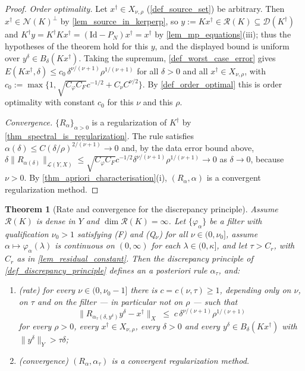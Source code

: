 \documentclass[a4paper]{report}
\theoremstyle{plain}
\newtheorem{theorem}{Theorem}[chapter]
\theoremstyle{definition}
\theoremstyle{remark}
\newcommand{\Ll}{\mathcal{L}}
\newcommand{\Ran}{\mathcal{R}}
\newcommand{\Ker}{\mathcal{N}}
\newcommand{\Dom}{\mathcal{D}}
\newcommand{\Id}{\mathrm{Id}}
\newcommand{\dg}{^{\dagger}}
\begin{document}
\begin{proof}
  \emph{Order optimality.}  Let $x\dg \in X_{\nu,\rho}$ (\cref{def_source_set}) be
  arbitrary.  Then $x\dg \in
  \Ker(K)^{\perp}$ by \cref{lem_source_in_kerperp}, so $y := Kx\dg \in \Ran(K) \subseteq
  \Dom(K\dg)$ and $K\dg y = K\dg Kx\dg = (\Id - P_N)x\dg = x\dg$ by
  \cref{lem_mp_equations}(iii); thus the hypotheses of the theorem hold for this $y$, and
  the displayed bound is uniform over $y^{\delta} \in B_{\delta}(Kx\dg)$.  Taking the
  supremum, \cref{def_worst_case_error} gives $E(Kx\dg,\delta) \le
  c_0\,\delta^{\nu/(\nu+1)}\rho^{1/(\nu+1)}$ for all $\delta > 0$ and all $x\dg \in
  X_{\nu,\rho}$, with $c_0 := \max\{1, \sqrt{C_{\varphi}C_F}c^{-1/2}
  + C_{\nu}C^{\nu/2}\}$.
  By \cref{def_order_optimal} this is order optimality with constant $c_0$ for this $\nu$
  and this $\rho$.

  \emph{Convergence.}  $\{R_{\alpha}\}_{\alpha>0}$ is a regularization of $K\dg$ by
  \cref{thm_spectral_is_regularization}.  The rule satisfies $\alpha(\delta) \le
  C(\delta/\rho)^{2/(\nu+1)} \to 0$ and, by the data error bound above,
  $\delta\|R_{\alpha(\delta)}\|_{\Ll(Y,X)} \le \sqrt{C_{\varphi}C_F}c^{-1/2}
  \delta^{\nu/(\nu+1)}\rho^{1/(\nu+1)} \to 0$ as $\delta \to 0$, because $\nu > 0$.  By
  \cref{thm_apriori_characterisation}(i), $(R_{\alpha},\alpha)$ is a convergent
  regularization method.
\end{proof}


\begin{theorem}[Rate and convergence for the discrepancy principle]
  \label{thm_discrepancy_order_optimal}
  Assume $\Ran(K)$ is dense in $Y$ and $\dim\Ran(K) = \infty$.  Let $\{\varphi_{\alpha}\}$
  be a filter with qualification $\nu_0 > 1$ satisfying (F) and (Q$_{\nu}$) for all
  $\nu \in (0,\nu_0]$, assume $\alpha \mapsto \varphi_{\alpha}(\lambda)$ is continuous on
  $(0,\infty)$ for each $\lambda \in (0,\kappa]$, and let $\tau > C_r$, with $C_r$ as in
  \cref{lem_residual_constant}.  Then the discrepancy principle of
  \cref{def_discrepancy_principle} defines an a posteriori rule $\alpha_{\tau}$, and:
  \begin{enumerate}
    \item \emph{(rate)} for every $\nu \in (0,\nu_0-1]$ there is $c = c(\nu,\tau) \ge 1$,
      depending only on $\nu$, on $\tau$ and on the filter --- in particular not on
      $\rho$ --- such that
      \[
        \bigl\|R_{\alpha_{\tau}(\delta,y^{\delta})}y^{\delta} - x\dg\bigr\|_X
          \;\le\; c\,\delta^{\nu/(\nu+1)}\rho^{1/(\nu+1)}
      \]
      for every $\rho > 0$, every $x\dg \in X_{\nu,\rho}$, every $\delta > 0$ and every
      $y^{\delta} \in B_{\delta}(Kx\dg)$ \emph{with} $\|y^{\delta}\|_Y > \tau\delta$;
    \item \emph{(convergence)} $(R_{\alpha},\alpha_{\tau})$ is a convergent
      regularization method.
  \end{enumerate}
\end{theorem}
\end{document}
